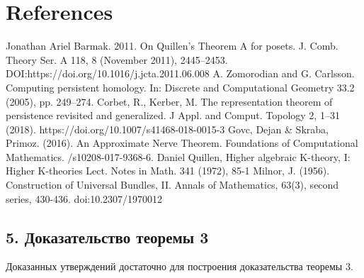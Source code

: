 \documentclass[a4paper, 12pt]{article}
\theoremstyle{definition}
\theoremstyle{remark}
\begin{document}
\section{References}

\begin{enumerate}
  Jonathan Ariel Barmak. 2011.
  \newblock On Quillen’s Theorem A for posets.
  \newblock J. Comb. Theory Ser. A 118, 8 (November 2011), 2445–2453.
  \newblock DOI:https://doi.org/10.1016/j.jcta.2011.06.008
  A. Zomorodian and G. Carlsson.
  \newblock Computing persistent homology.
  \newblock In: Discrete and Computational Geometry 33.2 (2005), pp. 249–274.
  Corbet, R., Kerber, M.
  \newblock The representation theorem of persistence revisited and generalized.
  \newblock J Appl. and Comput. Topology 2, 1–31 (2018).
  \newblock https://doi.org/10.1007/s41468-018-0015-3
  Govc, Dejan \& Skraba, Primoz. (2016).
  \newblock An Approximate Nerve Theorem.
  \newblock Foundations of Computational Mathematics.
  /s10208-017-9368-6.
  Daniel Quillen,
  \newblock Higher algebraic K-theory, I: Higher K-theories Lect.
  \newblock Notes in Math. 341 (1972), 85-1
  Milnor, J. (1956).
  \newblock Construction of Universal Bundles, II.
  \newblock Annals of Mathematics, 63(3), second series, 430-436.
  \newblock doi:10.2307/1970012
\end{enumerate}

\subsection*{5. Доказательство теоремы 3}

Доказанных утверждений достаточно для построения доказательства теоремы 3.
\end{document}
